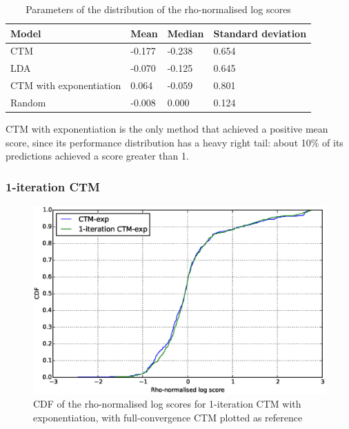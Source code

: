\documentclass[12pt,a4paper,twoside,openright]{report}
\begin{document}
\begin{table}
\begin{tabular}{| l | l | l | l |}
\hline
Model & Mean & Median & Standard deviation\\
\hline
CTM & -0.177 & -0.238 & 0.654 \\
LDA & -0.070 & -0.125 & 0.645 \\
CTM with exponentiation & 0.064 & -0.059 & 0.801 \\
Random & -0.008 & 0.000 & 0.124 \\
\hline
\end{tabular}
\caption{Parameters of the distribution of the rho-normalised log scores}
\label{tab:ctm-ctf-summary}
\end{table}

CTM with exponentiation is the only method that achieved a positive mean score, since its performance distribution has a heavy right tail: about 10\% of its predictions achieved a score greater than 1.

\subsubsection{1-iteration CTM}

\begin{figure}[!htb]
\includegraphics[width=\textwidth]{ctd-ctm-1iter-rho.eps}
\caption{CDF of the rho-normalised log scores for 1-iteration CTM with exponentiation, with full-convergence CTM plotted as reference}
\label{fig:ctd-ctm-1iter-rho}
\end{figure}
\end{document}
